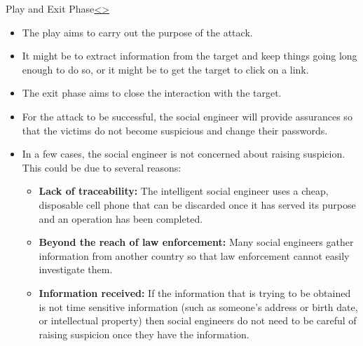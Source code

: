 \documentclass[12pt]{extarticle}
\newenvironment{instructionblock}{\Large\bgroup}{\egroup}
\newcommand{\bi}{\begin{itemize}}
\newcommand{\ei}{\end{itemize}}
\begin{document}
\pagebreak

\begin{slide}{Play and Exit Phase}{\hyperref[slide 12]{\textless}\hyperref[slide 14]{\textgreater}}
\begin{instructionblock}
\begin{itemize}
		\item The play aims to carry out the purpose of the attack. 
		\item It might be to extract information from the target and keep things going long enough to do so, or it might be to get the target to click on a link.
	\item The exit phase aims to close the interaction with the target.
	\item For the attack to be successful, the social engineer will provide assurances so that the victims do not become suspicious and change their passwords.
\end{itemize}
\end{instructionblock}
\end{slide}
\begin{itemize}
	\item In a few cases, the social engineer is not concerned about raising
	suspicion. This could be due to several reasons:
	\bi
	\item \textbf{Lack of traceability:} The intelligent social engineer uses a cheap, disposable cell phone that can be discarded once it has served its purpose and an operation has been completed. \cite{b2}
	\item \textbf{Beyond the reach of law enforcement:} Many social engineers gather information from another country so that law enforcement cannot easily investigate them.\cite{b2}
	\item \textbf{Information received:} If the information that is trying to be obtained is not time sensitive information (such as someone's address or birth date, or intellectual property) then social engineers do not need to be careful of raising suspicion once they have the information.\cite{b2}
	
	\ei
\end{itemize}
\pagebreak
\end{document}
